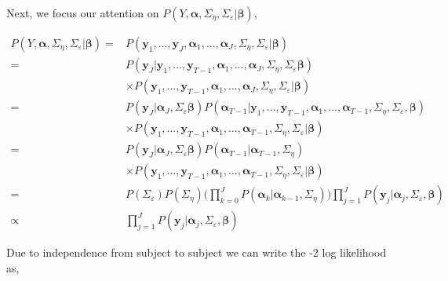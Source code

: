 \documentclass[
]{article}
\begin{document}
Next, we focus our attention on \(P(Y, \boldsymbol{\alpha}, \Sigma_\eta, \Sigma_\varepsilon|\boldsymbol{\beta})\),

\begin{equation*}
\begin{aligned}
P(Y, \boldsymbol{\alpha}, \Sigma_\eta, \Sigma_\varepsilon|\boldsymbol{\beta}) = &P(\boldsymbol{y}_1, ..., \boldsymbol{y}_J, \boldsymbol{\alpha}_1, ..., \boldsymbol{\alpha}_J, \Sigma_\eta, \Sigma_\varepsilon | \boldsymbol{\beta})\\
= & P(\boldsymbol{y}_J|\boldsymbol{y}_1, ..., \boldsymbol{y}_{T-1}, \boldsymbol{\alpha}_1, ..., \boldsymbol{\alpha}_J, \Sigma_\eta, \Sigma_\varepsilon \boldsymbol{\beta})\\
& \times P(\boldsymbol{y}_1, ..., \boldsymbol{y}_{T-1}, \boldsymbol{\alpha}_1, ..., \boldsymbol{\alpha}_J, \Sigma_\eta, \Sigma_\varepsilon | \boldsymbol{\beta})\\
= & P(\boldsymbol{y}_J|\boldsymbol{\alpha}_J, \Sigma_\varepsilon \boldsymbol{\beta})P(\boldsymbol{\alpha}_{T-1}|\boldsymbol{y}_1, ..., \boldsymbol{y}_{T-1}, \boldsymbol{\alpha}_1, ..., {\boldsymbol{\alpha}_{T-1}}, \Sigma_\eta, \Sigma_\varepsilon, \boldsymbol{\beta})\\
& \times P(\boldsymbol{y}_1, ..., \boldsymbol{y}_{T-1}, \boldsymbol{\alpha}_1, ..., {\boldsymbol{\alpha}_{T-1}}, \Sigma_\eta, \Sigma_\varepsilon | \boldsymbol{\beta})\\
= & P(\boldsymbol{y}_J|\boldsymbol{\alpha}_J, \Sigma_\varepsilon \boldsymbol{\beta})P(\boldsymbol{\alpha}_{T-1}|{\boldsymbol{\alpha}_{T-1}}, \Sigma_\eta)\\
& \times P(\boldsymbol{y}_1, ..., \boldsymbol{y}_{T-1}, \boldsymbol{\alpha}_1, ..., {\boldsymbol{\alpha}_{T-1}}, \Sigma_\eta, \Sigma_\varepsilon | \boldsymbol{\beta})\\
= &P(\Sigma_\varepsilon)P(\Sigma_\eta)\bigg(\prod^J_{k=0} P(\boldsymbol{\alpha}_k|\boldsymbol{\alpha}_{k-1},\Sigma_{\eta})\bigg) \prod^J_{j=1} P(\boldsymbol{y}_j|\boldsymbol{\alpha}_j, \Sigma_\varepsilon, \boldsymbol{\beta})\\
\propto & \prod^J_{j=1} P(\boldsymbol{y}_j|\boldsymbol{\alpha}_j, \Sigma_\varepsilon, \boldsymbol{\beta})
\end{aligned}
\end{equation*}

Due to independence from subject to subject we can write the -2 log likelihood as,
\end{document}
